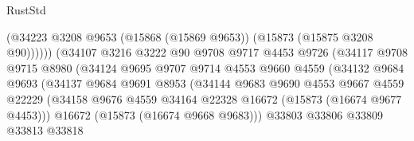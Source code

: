 \begin{lexlean}{RustStd}
\begin{coremodule}
                                        (@34223
                                          @3208
                                          @9653
                                          (@15868 (@15869 @9653))
                                          (@15873 (@15875 @3208 @90))))))
                                  (@34107
                                    @3216
                                    @3222
                                    @90
                                    @9708
                                    @9717
                                    @4453
                                    @9726
                                    (@34117
                                      @9708
                                      @9715
                                      @8980
                                      (@34124
                                        @9695
                                        @9707
                                        @9714
                                        @4553
                                        @9660
                                        @4559
                                        (@34132
                                          @9684
                                          @9693
                                          (@34137
                                            @9684
                                            @9691
                                            @8953
                                            (@34144
                                              @9683
                                              @9690
                                              @4553
                                              @9667
                                              @4559
                                              @22229
                                              (@34158
                                                @9676
                                                @4559
                                                @34164
                                                @22328
                                                @16672
                                                (@15873 (@16674 @9677 @4453)))
                                              @16672
                                              (@15873 (@16674 @9668 @9683)))
                                            @33803
                                            @33806
                                            @33809
                                            @33813
                                            @33818

\end{coremodule}
\end{lexlean}
